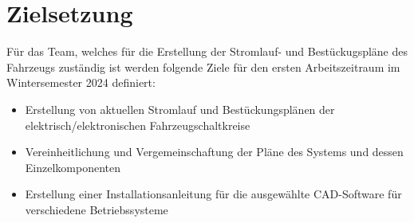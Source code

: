 \section*{Zielsetzung}
Für das Team, welches für die \glqq Erstellung der Stromlauf- und Bestückugspläne des Fahrzeugs\grqq{} zuständig ist werden folgende Ziele für den ersten Arbeitszeitraum im Wintersemester 2024 definiert:
\begin{itemize}
	\item Erstellung von aktuellen Stromlauf und Bestückungsplänen der \newline elektrisch/elektronischen Fahrzeugschaltkreise
	\item Vereinheitlichung und Vergemeinschaftung der Pläne des Systems und dessen Einzelkomponenten
	\item Erstellung einer Installationsanleitung für die ausgewählte CAD-Software für verschiedene Betriebssysteme
\end{itemize}
\clearpage

